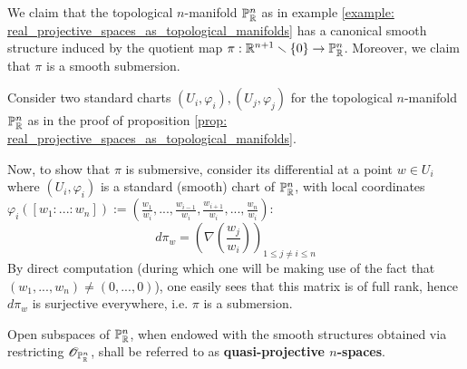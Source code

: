         \begin{example} \label{example: real_projeective_spaces_as_smooth_manifolds}
            We claim that the topological $n$-manifold $\mathbb{P}^n_{\mathbb{R}}$ as in example \ref{example: real_projective_spaces_as_topological_manifolds} has a canonical smooth structure induced by the quotient map $\pi: \mathbb{R}^{n + 1} \smallsetminus \{0\} \to \mathbb{P}^n_{\mathbb{R}}$. Moreover, we claim that $\pi$ is a smooth submersion.
            
            Consider two standard charts $(U_i, \varphi_i), (U_j, \varphi_j)$ for the topological $n$-manifold $\mathbb{P}^n_{\mathbb{R}}$ as in the proof of proposition \ref{prop: real_projective_spaces_as_topological_manifolds}.

            Now, to show that $\pi$ is submersive, consider its differential at a point $w \in U_i$ where $(U_i, \varphi_i)$ is a standard (smooth) chart of $\mathbb{P}^n_{\mathbb{R}}$, with local coordinates $\varphi_i([w_1 : ... : w_n]) := \left( \frac{w_1}{w_i}, ..., \frac{w_{i - 1}}{w_i}, \frac{w_{i + 1}}{w_i}, ..., \frac{w_n}{w_i} \right)$:
                $$d\pi_w = \left( \nabla\left( \frac{w_j}{w_i} \right) \right)_{1 \leq j \not = i \leq n}$$
            By direct computation (during which one will be making use of the fact that $(w_1, ..., w_n) \not = (0, ..., 0)$), one easily sees that this matrix is of full rank, hence $d\pi_w$ is surjective everywhere, i.e. $\pi$ is a submersion.
        \end{example}
        \begin{convention} \label{conv: quasi_projective_spaces}
            Open subspaces of $\mathbb{P}^n_{\mathbb{R}}$, when endowed with the smooth structures obtained via restricting $\mathscr{O}_{\mathbb{P}^n_{\mathbb{R}}}$, shall be referred to as \textbf{quasi-projective $n$-spaces}. 
        \end{convention}

